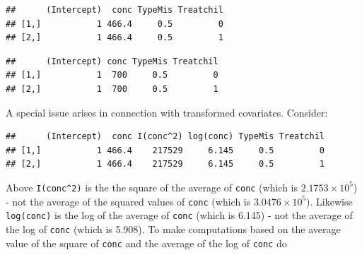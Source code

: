 \documentclass[
]{article}
\newenvironment{Shaded}{\begin{snugshade}}{\end{snugshade}}
\newcommand{\AttributeTok}[1]{\textcolor[rgb]{0.77,0.63,0.00}{#1}}
\newcommand{\DecValTok}[1]{\textcolor[rgb]{0.00,0.00,0.81}{#1}}
\newcommand{\FunctionTok}[1]{\textcolor[rgb]{0.00,0.00,0.00}{#1}}
\newcommand{\NormalTok}[1]{#1}
\newcommand{\OtherTok}[1]{\textcolor[rgb]{0.56,0.35,0.01}{#1}}
\newcommand{\SpecialCharTok}[1]{\textcolor[rgb]{0.00,0.00,0.00}{#1}}
\newcommand{\StringTok}[1]{\textcolor[rgb]{0.31,0.60,0.02}{#1}}
\begin{document}
\begin{verbatim}
##      (Intercept)  conc TypeMis Treatchil
## [1,]           1 466.4     0.5         0
## [2,]           1 466.4     0.5         1
\end{verbatim}

\begin{Shaded}
\end{Shaded}

\begin{verbatim}
##      (Intercept) conc TypeMis Treatchil
## [1,]           1  700     0.5         0
## [2,]           1  700     0.5         1
\end{verbatim}

A special issue arises in connection with transformed covariates.
Consider:

\begin{Shaded}
\end{Shaded}

\begin{verbatim}
##      (Intercept)  conc I(conc^2) log(conc) TypeMis Treatchil
## [1,]           1 466.4    217529     6.145     0.5         0
## [2,]           1 466.4    217529     6.145     0.5         1
\end{verbatim}

Above \verb'I(conc^2)' is the the square of the average of \texttt{conc}
(which is \ensuremath{2.1753\times 10^{5}}) - not the average of the
squared values of \texttt{conc} (which is
\ensuremath{3.0476\times 10^{5}}). Likewise \texttt{log(conc)} is the
log of the average of \texttt{conc} (which is 6.145) - not the average
of the log of \texttt{conc} (which is 5.908). To make computations based
on the average value of the square of \texttt{conc} and the average of
the log of \texttt{conc} do
\end{document}
